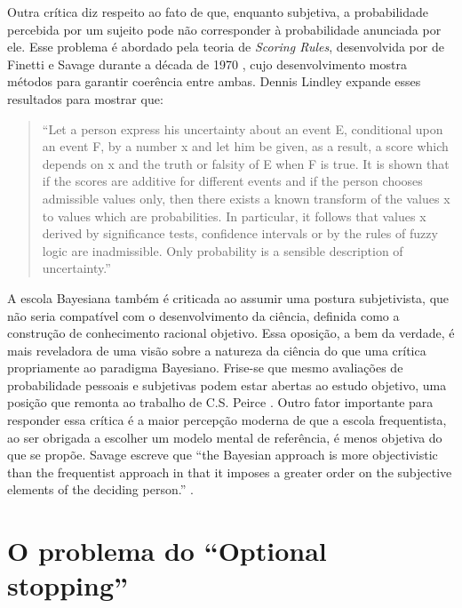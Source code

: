 Outra crítica diz respeito ao fato de que, enquanto subjetiva, a probabilidade percebida por um sujeito pode não corresponder
à probabilidade anunciada por ele. Esse problema é abordado pela teoria de {\em Scoring Rules}, desenvolvida por
de Finetti e Savage durante a década de 1970 \citep{Lindley82}, cujo
desenvolvimento mostra métodos para garantir coerência entre ambas. Dennis Lindley expande esses resultados para mostrar que:

\begin{quote}
``Let a person express his uncertainty about an event E, conditional upon an event F, by a number x and let him be given, 
as a result, a score which depends on x and the truth or falsity of E when F is true. It is shown that if the scores are 
additive for different events and if the person chooses admissible values only, then there exists a known transform of the 
values x to values which are probabilities. In particular, it follows that values x derived by significance tests, confidence 
intervals or by the rules of fuzzy logic are inadmissible. Only probability is a sensible description of uncertainty.''
\citep{Lindley82}
\end{quote}

A escola Bayesiana também é criticada ao assumir uma postura subjetivista, que não seria compatível com o desenvolvimento
da ciência, definida como a construção de conhecimento racional objetivo. Essa oposição, a bem da verdade, é mais reveladora
de uma visão sobre a natureza da ciência do que uma crítica propriamente ao paradigma Bayesiano. Frise-se que mesmo 
avaliações de probabilidade pessoais e subjetivas podem estar abertas ao estudo objetivo, uma posição que remonta ao trabalho
de C.S. Peirce \citep{Stigler78}.  Outro fator importante para responder essa crítica é a maior percepção moderna
de que a escola frequentista, ao ser obrigada a escolher um modelo mental de referência, é menos objetiva do que se propõe.
Savage escreve que ``the Bayesian approach is more objectivistic than the frequentist approach in that it imposes a greater
order on the subjective elements of the deciding person.'' \citep{Savage60}.

\section {O problema do ``Optional stopping''} 

